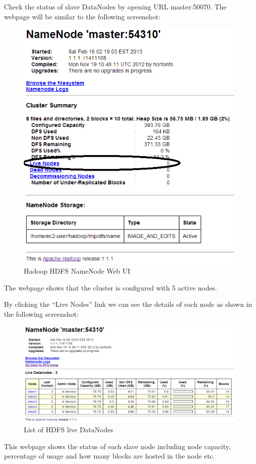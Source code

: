 Check the status of slave DataNodes by opening URL master:50070. The webpage will be similar to the following screenshot: \\
\begin{figure}[h]
  \centering
  \includegraphics[width=.6\textwidth]{figs/5163os_03_04.png}
  \caption{Hadoop HDFS NameNode Web UI}\label{fig:namenode.webui}
\end{figure} 

The webpage shows that the cluster is configured with 5 active nodes.

By clicking the ``Live Nodes'' link we can see the details of each node as shown in the following screenshot:
\begin{figure}[h]
  \centering
  \includegraphics[width=.8\textwidth]{figs/5163os_03_05.png}
  \caption{List of HDFS live DataNodes}\label{fig:hdfs.datanodes}
\end{figure} 


This webpage shows the status of each slave node including node capacity, percentage of usage and how many blocks are hosted in the node etc.

